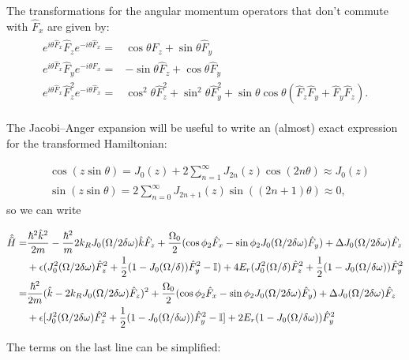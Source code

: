 The transformations for the angular momentum operators that don't commute with $\hat{F}_x$ are given by: 
%
\begin{align}
	\begin{split}
		e^{i\theta \hat{F}_x} \hat{F}_z e^{-i\theta \hat{F}_x}=& \cos\theta \hat{F}_z + \sin\theta\hat{F}_y \\
		e^{i\theta \hat{F}_x} \hat{F}_y e^{-i\theta \hat{F}_x} =& -\sin\theta\hat{F}_z +\cos\theta\hat{F}_y \\
		e^{i\theta \hat{F}_x} \hat{F}_z^2 e^{-i\theta \hat{F}_x} = &\cos^2\theta\hat{F}_z^2+\sin^2\theta\hat{F}_y^2 + \sin\theta\cos\theta(\hat{F}_z\hat{F}_y + \hat{F}_y\hat{F}_z).
	\end{split}
\end{align}

The Jacobi–Anger expansion will be useful to write an (almost) exact expression for the transformed Hamiltonian:

\begin{align}
	&\cos(z\sin\theta)= J_0(z) + 2\sum_{n=1}^{\infty}J_{2n}(z)\cos(2n\theta) \approx J_0(z) \\
	&\sin(z\sin\theta)= 2\sum_{n=0}^{\infty}J_{2n+1}(z)\sin((2n+1)\theta) \approx 0,
\end{align} 
%
%
so we can write

\begin{align}
	\begin{split}
		\hat{\tilde{H}} = &\frac{\hbar^2\hat{k}^2}{2m} - \frac{\hbar^2}{m}2{{k_R}} J_0(\Omega/2\delta\omega)\hat{k}\hat{F}_z + \frac{\Omega_0}{2}(\cos\phi_2\hat{F}_x - \sin\phi_2J_0(\Omega/2\delta\omega)\hat{F}_y)+ \Delta J_0(\Omega/2\delta\omega)\hat{F}_z \\
		&+\epsilon(J_0^2(\Omega/2\delta\omega)\hat{F}_z^2 + \frac{1}{2}(1-J_0(\Omega/\delta))\hat{F}_y^2-\mathbb{I})+4E_r(J_0^2(\Omega/\delta)\hat{F}_z^2 + \frac{1}{2}(1-J_0(\Omega/\delta\omega))\hat{F}_y^2\\
		= & \frac{\hbar^2}{2m}(\hat{k}-2{{k_R}} J_0(\Omega/2\delta\omega)\hat{F}_z)^2 +\frac{\Omega_0}{2}(\cos\phi_2\hat{F}_x - \sin\phi_2J_0(\Omega/2\delta\omega)\hat{F}_y) + \Delta J_0(\Omega/2\delta\omega)\hat{F}_z \\
		& + \epsilon[J_0^2(\Omega/2\delta\omega)\hat{F}_z^2 + \frac{1}{2}(1-J_0(\Omega/\delta\omega))\hat{F}_y^2-\mathbb{I}]+2E_r (1-J_0(\Omega/\delta\omega))\hat{F}_y^2
	\end{split}
\end{align}


The terms on the last line can be simplified:

